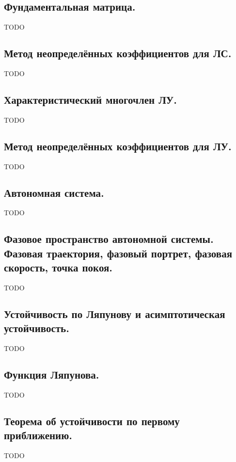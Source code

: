 \documentclass{article}
\begin{document}
\subsection{Фундаментальная матрица.}
TODO

\subsection{Метод неопределённых коэффициентов для ЛС.}
TODO

\subsection{Характеристический многочлен ЛУ.}
TODO

\subsection{Метод неопределённых коэффициентов для ЛУ.}
TODO

\subsection{Автономная система.}
TODO

\subsection{Фазовое пространство автономной системы. Фазовая траектория, фазовый
портрет, фазовая скорость, точка покоя.}
TODO

\subsection{Устойчивость по Ляпунову и асимптотическая устойчивость.}
TODO

\subsection{Функция Ляпунова.}
TODO

\subsection{Теорема об устойчивости по первому приближению.}
TODO
\end{document}

